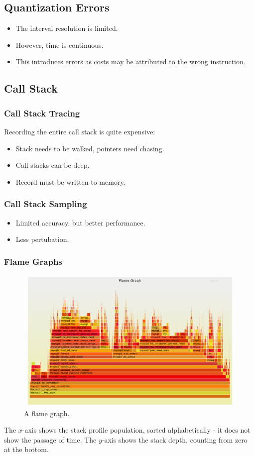 \documentclass[11pt]{article}
\begin{document}
\subsection{Quantization Errors}
\begin{itemize}
  \item The interval resolution is limited.
  \item However, time is continuous.
  \item This introduces errors as costs may be attributed to the wrong instruction.
\end{itemize}

\subsection{Call Stack}
\subsubsection{Call Stack Tracing}
Recording the entire call stack is quite expensive:
\begin{itemize}
  \item Stack needs to be walked, pointers need chasing.
  \item Call stacks can be deep.
  \item Record must be written to memory.
\end{itemize}

\subsubsection{Call Stack Sampling}
\begin{itemize}
  \item Limited accuracy, but better performance.
  \item Less pertubation.
\end{itemize}

\subsubsection{Flame Graphs}
\begin{figure}[htb!]
  \centering
  \caption{A flame graph.}
  \includegraphics[scale=0.4]{flamegraph}
\end{figure}
The $x$-axis shows the stack profile population, sorted alphabetically - it does not show the passage of time.
The $y$-axis shows the stack depth, counting from zero at the bottom.
\end{document}
